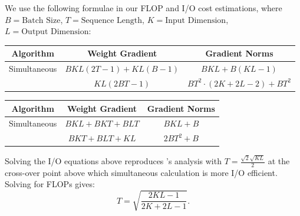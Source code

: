 \documentclass{article}
\begin{document}
We use the following formulae in our FLOP and I/O cost estimations, where $B = \text{Batch Size}$, $T = \text{Sequence Length}$, $K = \text{Input Dimension}$, $L = \text{Output Dimension}$:
\begin{center}
\begin{tabular}{ c || c | c }
\hline
Algorithm & Weight Gradient & Gradient Norms \\ \hline
Simultaneous & $B K L \left(2 T - 1\right) + K L \left(B - 1\right)$ & $B K L + B \left(K L - 1\right)$ \\
\cite{li2022large} & $K L \left(2 B T - 1\right)$ & $B T^{2} \cdot \left(2 K + 2 L - 2\right) + B T^{2}$ \\
\hline
\end{tabular}
\begin{tabular}{ c || c | c }
\hline
Algorithm & Weight Gradient & Gradient Norms \\ \hline
Simultaneous & $B K L + B K T + B L T$ & $B K L + B$ \\
\cite{li2022large} & $B K T + B L T + K L$ & $2 B T^{2} + B$ \\
\hline
\end{tabular}
\end{center}

Solving the I/O equations above reproduces \cite{li2022large}'s analysis with $T = \frac{\sqrt{2} \sqrt{K L}}{2}$ at the cross-over point above which simultaneous calculation is more I/O efficient. Solving for FLOPs gives:
\[
T = \sqrt{\frac{2 K L - 1}{2 K + 2 L - 1}}.
\]

\FloatBarrier
\clearpage
\end{document}

